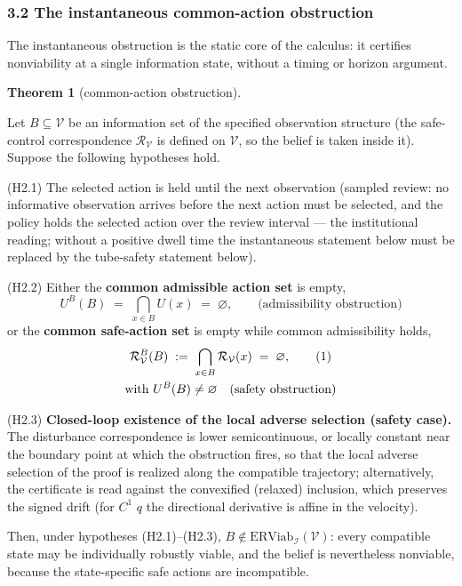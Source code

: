 \documentclass[10pt,twocolumn]{article}
\theoremstyle{definition}
\newtheorem{theorem}{Theorem}
\begin{document}
\subsubsection{3.2 The instantaneous common-action
obstruction}\label{the-instantaneous-common-action-obstruction}

The instantaneous obstruction is the static core of the calculus: it certifies nonviability at a single information state, without a timing or horizon argument.

\begin{theorem}[common-action obstruction]\label{thm:common-action}

Let \(B \subseteq \mathcal{V}\) be an information set of the specified observation structure (the safe-control correspondence
\(\mathcal{R}_{\mathcal{V}}\) is defined on \(\mathcal{V}\), so the
belief is taken inside it). Suppose the following hypotheses hold.

(H2.1) The selected action is held until the next observation (sampled
review: no informative observation arrives before the next action must
be selected, and the policy holds the selected action over the review
interval --- the institutional reading; without a positive dwell time
the instantaneous statement below must be replaced by the tube-safety statement below).

(H2.2) Either the \textbf{common admissible action set} is empty,
\[U^B(B) \;=\; \bigcap_{x \in B} U(x) \;=\; \varnothing, \qquad \text{(admissibility obstruction)}\]
or the \textbf{common safe-action set} is empty while common
admissibility holds,
\begin{gather}
\mathcal{R}_{\mathcal{V}}^B(B) \;:=\; \bigcap_{x \in B} \mathcal{R}_{\mathcal{V}}(x) \;=\; \varnothing, \tag{1}\\
\text{with } U^B(B) \neq \varnothing \quad \text{(safety obstruction)} \notag
\end{gather}

(H2.3) \textbf{Closed-loop existence of the local adverse selection
(safety case).} The disturbance correspondence is lower semicontinuous,
or locally constant near the boundary point at which the obstruction
fires, so that the local adverse selection of the proof is realized
along the compatible trajectory; alternatively, the certificate is read
against the convexified (relaxed) inclusion, which preserves the
signed drift (for \(C^1\) \(q\) the directional derivative is affine in the velocity).

Then, under hypotheses (H2.1)--(H2.3),
\(B \notin \mathrm{ERViab}_{\mathcal{I}}(\mathcal{V})\): every
compatible state may be individually robustly viable, and the belief is
nevertheless nonviable, because the state-specific safe actions are
incompatible.

\end{theorem}
\end{document}

